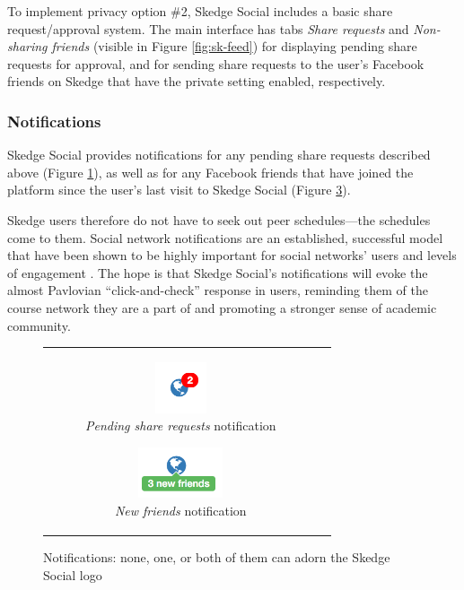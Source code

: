  \noindent To implement privacy option \#2, Skedge Social includes a basic share request/approval system. The main interface has tabs \emph{Share requests} and \emph{Non-sharing friends} (visible in Figure \ref{fig:sk-feed}) for displaying pending share requests for approval, and for sending share requests to the user's Facebook friends on Skedge that have the private setting enabled, respectively.

  \subsubsection{Notifications}

  Skedge Social provides notifications for any pending share requests described above (Figure \ref{fig:sk-social-note1}), as well as for any Facebook friends that have joined the platform since the user's last visit to Skedge Social (Figure \ref{fig:sk-social-note2}). 

  Skedge users therefore do not have to seek out peer schedules---the schedules come to them. Social network notifications are an established, successful model that have been shown to be highly important for social networks' users and levels of engagement \cite{notifications}. The hope is that Skedge Social's notifications will evoke the almost Pavlovian ``click-and-check'' response in users, reminding them of the course network they are a part of and promoting a stronger sense of academic community.

  \begin{figure}[H]
    \centering
    \begin{tabular}{c c}
      \begin{subfigure}[w]{5.5cm}
        \centering
        \includegraphics[height=1.5cm]{images/skedge/social-note1}
        \caption{\emph{Pending share requests} notification} \label{fig:sk-social-note1}
      \end{subfigure}

      \hspace{20pt}
      
      \begin{subfigure}[w]{6.5cm}
        \centering
        \includegraphics[height=1.5cm]{images/skedge/social-note2}
        \caption{\emph{New friends} notification} \label{fig:sk-social-note2}
      \end{subfigure}
    \end{tabular}
    \caption[Skedge Social's notifications]{Notifications: none, one, or both of them can adorn the Skedge Social logo}
  \end{figure}

